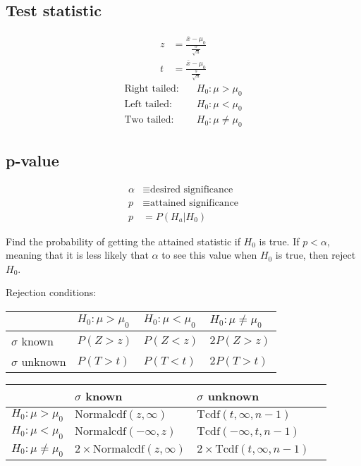 \documentclass{article}
\newcommand{\normalcdf}{\text{Normalcdf}}
\newcommand{\tcdf}{\text{Tcdf}}
\begin{document}
\begin{multicols*}{2}
\subsection{Test statistic}
\begin{align*}
    z &= \frac{\bar{x} - \mu_0}{\frac{\sigma}{\sqrt{n}}} \\
    t &= \frac{\bar{x} - \mu_0}{\frac{s}{\sqrt{n}}}
\end{align*}
\begin{align*}
    \text{Right tailed:} \quad & H_0: \mu > \mu_0 \\
    \text{Left tailed:}  \quad & H_0: \mu < \mu_0 \\
    \text{Two tailed:}   \quad & H_0: \mu \neq \mu_0
\end{align*}

\subsection{p-value}
\begin{align*}
    \alpha &\equiv \text{desired significance} \\
    p &\equiv \text{attained significance} \\
    p &= P(H_a | H_0)
\end{align*}

Find the probability of getting the attained statistic if $H_0$ is true. If $p < \alpha$, meaning that it is less likely that $\alpha$ to see this value when $H_0$ is true, then reject $H_0$.

Rejection conditions:
\begin{center}
    \begin{tabular}{|l|l|l|l|}
        \hline
                         & $H_0: \mu > \mu_0$ & $H_0: \mu < \mu_0$ & $H_0: \mu \neq \mu_0$ \\ \hline
        $\sigma$ known   & $P(Z > z)$         & $P(Z < z)$         & $2P(Z > z)$           \\ \hline
        $\sigma$ unknown & $P(T > t)$         & $P(T < t)$         & $2P(T > t)$           \\ \hline
    \end{tabular}
\end{center}

\begin{center}
    \begin{tabular}{|l|l|l|l|}
        \hline
                              & $\sigma$ known                   & $\sigma$ unknown                   \\ \hline
        $H_0: \mu > \mu_0$    & $\normalcdf(z, \infty)$          & $\tcdf(t, \infty, n - 1)$          \\ \hline
        $H_0: \mu < \mu_0$    & $\normalcdf(-\infty, z)$         & $\tcdf(-\infty, t, n - 1)$         \\ \hline
        $H_0: \mu \neq \mu_0$ & $2 \times \normalcdf(z, \infty)$ & $2 \times \tcdf(t, \infty, n - 1)$ \\ \hline
    \end{tabular}
\end{center}


\end{multicols*}
\end{document}
